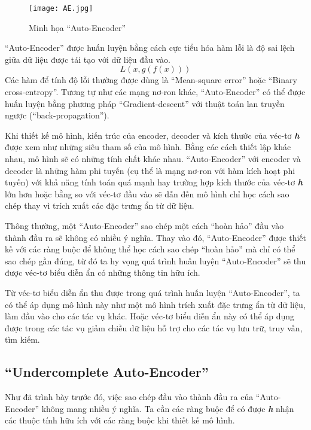 \begin{figure}
    \centering
	\texttt{[image: AE.jpg]}
    \caption{Minh họa ``Auto-Encoder''}
    \label{fig_AE}
\end{figure}

``Auto-Encoder'' được huấn luyện bằng cách cực tiểu hóa hàm lỗi là độ sai lệch giữa dữ liệu được tái tạo
với dữ liệu đầu vào. 
\begin{equation}
\label{AE_loss}
    L(x, g(f(x)))
\end{equation}
Các hàm để tính độ lỗi thường được dùng là ``Mean-square error'' hoặc ``Binary cross-entropy''.
Tương tự như các mạng nơ-ron khác, ``Auto-Encoder'' có thể được huấn luyện bằng phương pháp ``Gradient-descent''
với thuật toán lan truyền ngược (``back-propagation'').



Khi thiết kế mô hình, kiến trúc của encoder, decoder
và kích thước của véc-tơ \textbf{\textit{h}} được xem như những siêu tham số của mô hình.
Bằng các cách thiết lập khác nhau, mô hình sẽ có những tính chất khác nhau. 
``Auto-Encoder'' với encoder và decoder là những hàm phi tuyến (cụ thể là mạng nơ-ron với hàm kích hoạt phi tuyến)
với khả năng tính toán quá mạnh hay trường hợp kích thước của véc-tơ \textbf{\textit{h}}
lớn hơn hoặc bằng so với véc-tơ đầu vào sẽ dẫn đến mô hình chỉ học cách sao chép thay vì trích xuất các đặc trưng ẩn từ dữ liệu. 

Thông thường, một ``Auto-Encoder'' sao chép một cách ``hoàn hảo'' đầu vào thành đầu ra
sẽ không có nhiều ý nghĩa. Thay vào đó, ``Auto-Encoder'' được thiết kế với các ràng buộc để không thể
học cách sao chép ``hoàn hảo'' mà chỉ có thể sao chép gần đúng, từ đó ta hy vọng quá trình 
huấn luyện ``Auto-Encoder'' sẽ thu được véc-tơ biểu diễn ẩn có những thông tin hữu ích.

Từ véc-tơ biểu diễn ẩn thu được trong quá trình huấn luyện ``Auto-Encoder'', ta có thể áp dụng mô hình này
như một mô hình trích xuất đặc trưng ẩn từ dữ liệu, làm đầu vào cho các tác vụ khác. 
Hoặc véc-tơ biểu diễn ẩn này có thể áp dụng được trong các tác vụ giảm chiều dữ liệu hỗ trợ cho các tác vụ
lưu trữ, truy vấn, tìm kiếm.

    \subsection{``Undercomplete Auto-Encoder''}
    \label{chap2/subsec11}
    Như đã trình bày trước đó, việc sao chép đầu vào thành đầu ra của ``Auto-Encoder'' không mang nhiều ý nghĩa.
    Ta cần các ràng buộc để có được \textbf{\textit{h}}
    nhận các thuộc tính hữu ích với các ràng buộc khi thiết kế mô hình.
    
